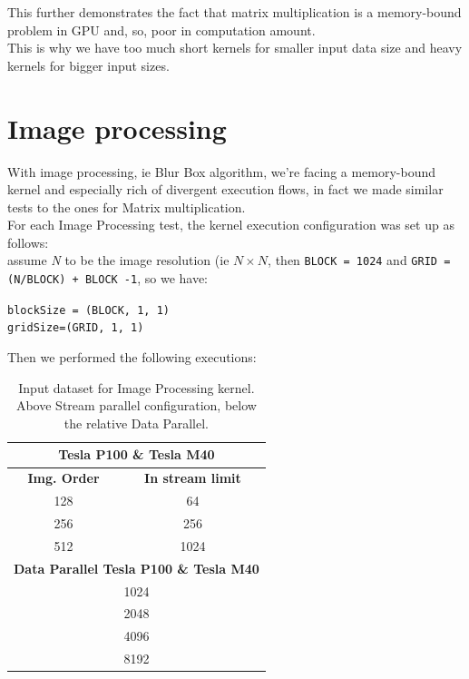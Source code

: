 This further demonstrates the fact that matrix multiplication is a memory-bound problem in GPU and, so, poor in computation amount.\\
This is why we have too much short kernels for smaller input data size and heavy kernels for bigger input sizes.


\section{Image processing}
With image processing, ie Blur Box algorithm, we're facing a memory-bound kernel and especially rich of divergent execution flows, in fact we made similar tests to the ones for Matrix multiplication.\\
For each Image Processing test, the kernel execution configuration was set up as follows:\\
assume \textit{N} to be the image resolution (ie \(N\times N\), then \texttt{BLOCK = 1024} and
\texttt{GRID = (N/BLOCK) + BLOCK -1}, so we have:
\begin{center}	
	\texttt{blockSize = (BLOCK, 1, 1)}\\
	\texttt{gridSize=(GRID, 1, 1)}
\end{center}
Then we performed the following executions:


\begin{table}	
	\centering
	\begin{tabular}{| c | c |} 
		\hline
		
		 \multicolumn{2}{c}{\textbf{Tesla P100} \& \textbf{Tesla M40}} \\ [0.5ex]
		\hline
		
		\textbf{Img. Order} & \textbf{In stream limit} \\ 
		\hline\hline
		128 & 64 \\ 
		\hline		
		256	& 256 \\ 
		\hline			
		512	& 1024 \\ 
		
		\hline\hline	
		\multicolumn{2}{c}{\textbf{Data Parallel Tesla P100 \& Tesla M40}} \\ [0.5ex] 
		
		\hline\hline		
		\multicolumn{2}{c}{1024 } \\ [0.5ex] 
		
		\multicolumn{2}{c}{2048 } \\ [0.5ex] 
		
		\multicolumn{2}{c}{4096 } \\ [0.5ex] 
		
		\multicolumn{2}{c}{8192 } \\ [0.5ex] 
		\hline	
	\end{tabular}
	\caption{Input dataset for Image Processing kernel. Above Stream parallel configuration, below the relative Data Parallel.}	
	\label{tab:imgdata}		
\end{table}

